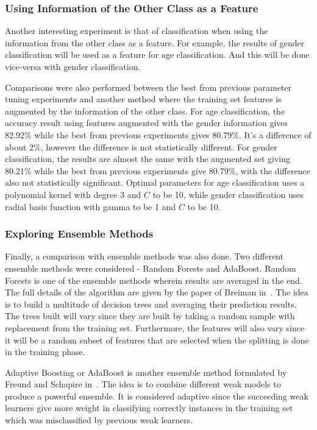 \documentclass[a4paper]{llncs}
\begin{document}
\subsubsection{Using Information of the Other Class as a Feature}
Another interesting experiment is that of classification when using the information from the other class as a feature. For example, the results of gender classification will be used as a feature for age classification. And this will be done vice-versa with gender classification.  

Comparisons were also performed between the best from previous parameter tuning experiments and another method where the training set features is augmented by the information of the other class. For age classification, the accuracy result using features augmented with the gender information gives 82.92\% while the best from previous experiments gives 80.79\%. It's a difference of about 2\%, however the difference is not statistically different. For gender classification, the results are almost the same with the augmented set giving 80.21\% while the best from previous experiments give 80.79\%, with the difference also not statistically significant. Optimal parameters for age classification uses a polynomial kernel with degree 3 and $C$ to be 10, while gender classification uses radial basis function with gamma to be 1 and $C$ to be 10.


\subsubsection{Exploring Ensemble Methods}
Finally, a comparison with ensemble methods was also done. Two different ensemble methods were considered - Random Forests and AdaBoost. Random Forests is one of the ensemble methods wherein results are averaged in the end. The full details of the algorithm are given by the paper of Breiman in~\cite{breiman2001random}. The idea is to build a multitude of decision trees and averaging their prediction results. The trees built will vary since they are built by taking a random sample with replacement from the training set. Furthermore, the features will also vary since it will be a random subset of features that are selected when the splitting is done in the training phase. 

Adaptive Boosting or AdaBoost is another ensemble method formulated by Freund and Schapire in~\cite{freund1997decision}. The idea is to combine different weak models to produce a powerful ensemble. It is considered adaptive since the succeeding weak learners give more weight in classifying correctly instances in the training set which was misclassified by previous weak learners. 
\end{document}
